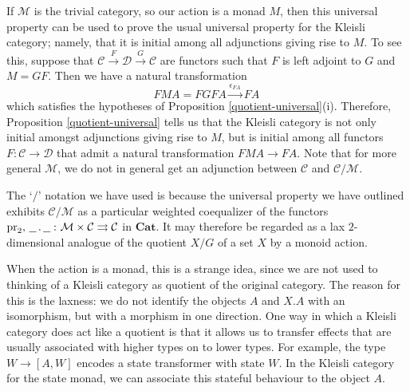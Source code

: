 \documentclass{svproc}
\newcommand\C{\mathcal{C}}
\newcommand\D{\mathcal{D}}
\newcommand\M{\mathcal{M}}
\DeclareMathOperator\pr{pr}
\newcommand*\from{\colon}
\newcommand{\0}{{\mathtt{0}}} \newcommand{\com}{{\mathtt{com}}}
\newcommand{\blank}{\,\underline{\hspace{1.5ex}}\,}
\newcommand{\catname}[1]{\mathbf{#1}}
\newcommand{\Cat}{\catname{Cat}}
\begin{document}
\begin{remark}
  If $\M$ is the trivial category, so our action is a monad $M$, then this universal property can be used to prove the usual universal property for the Kleisli category; namely, that it is initial among all adjunctions giving rise to $M$.  
  To see this, suppose that $\C \xrightarrow{F} \D \xrightarrow{G} \C$ are functors such that $F$ is left adjoint to $G$ and $M=GF$.  
  Then we have a natural transformation
  \[
    FMA = FGF A \xrightarrow{\epsilon_{F A}} F A\,
    \]
  which satisfies the hypotheses of Proposition \ref{quotient-universal}(i).  
  Therefore, Proposition \ref{quotient-universal} tells us that the Kleisli category is not only initial amongst adjunctions giving rise to $M$, but is initial among all functors $F\from \C \to \D$ that admit a natural transformation $FMA \to FA$.
  Note that for more general $\M$, we do not in general get an adjunction between $\C$ and $\C/\M$.

  The `$/$' notation we have used is because the universal property we have outlined exhibits $\C/\M$ as a particular weighted coequalizer of the functors $\pr_2,\blank.\blank\from \M\times\C \rightrightarrows \C$ in $\Cat$.
  It may therefore be regarded as a lax $2$-dimensional analogue of the quotient $X/G$ of a set $X$ by a monoid action.  
  
  When the action is a monad, this is a strange idea, since we are not used to thinking of a Kleisli category as quotient of the original category.  
  The reason for this is the laxness: we do not identify the objects $A$ and $X.A$ with an isomorphism, but with a morphism in one direction.  
  One way in which a Kleisli category does act like a quotient is that it allows us to transfer effects that are usually associated with higher types on to lower types.  
  For example, the type $W\to [A,W]$ encodes a state transformer with state $W$.  
  In the Kleisli category for the state monad, we can associate this stateful behaviour to the object $A$.
\end{remark}
\end{document}
